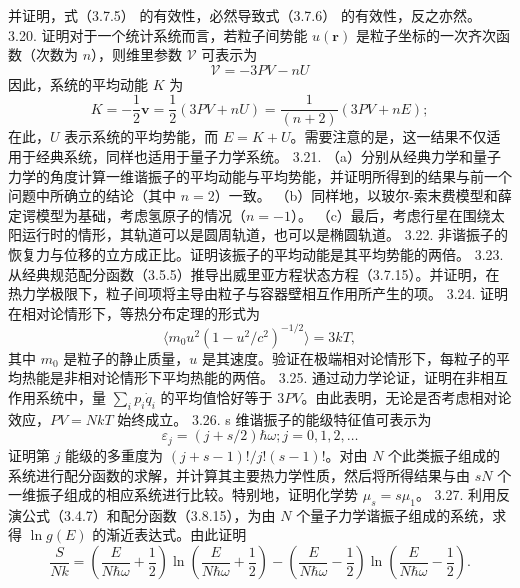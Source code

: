并证明，式（3.7.5） 的有效性，必然导致式（3.7.6） 的有效性，反之亦然。
3.20. 证明对于一个统计系统而言，若粒子间势能 \(u(\boldsymbol{r})\) 是粒子坐标的一次齐次函数（次数为 \(n\)），则维里参数 \(\mathcal{V}\) 可表示为
\begin{equation}\tag{3.5.133}\label{eq:3.5.133}
\mathcal { V } = - 3 P V - n U
\end{equation}
因此，系统的平均动能 \(K\) 为
\begin{equation}\tag{3.5.134}\label{eq:3.5.134}
K = - { \frac { 1 } { 2 } } { \mathbf { v } } = { \frac { 1 } { 2 } } ( 3 P V + n U ) = { \frac { 1 } { ( n + 2 ) } } ( 3 P V + n E ) ;
\end{equation}
在此，\(U\) 表示系统的平均势能，而 \(E = K + U\)。需要注意的是，这一结果不仅适用于经典系统，同样也适用于量子力学系统。
3.21. （a）分别从经典力学和量子力学的角度计算一维谐振子的平均动能与平均势能，并证明所得到的结果与前一个问题中所确立的结论（其中 \(n=2\)）一致。
（b）同样地，以玻尔-索末费模型和薛定谔模型为基础，考虑氢原子的情况（\(n=-1\)）。
（c）最后，考虑行星在围绕太阳运行时的情形，其轨道可以是圆周轨道，也可以是椭圆轨道。
3.22. 非谐振子的恢复力与位移的立方成正比。证明该振子的平均动能是其平均势能的两倍。
3.23. 从经典规范配分函数（3.5.5）推导出威里亚方程状态方程（3.7.15）。并证明，在热力学极限下，粒子间项将主导由粒子与容器壁相互作用所产生的项。
3.24. 证明在相对论情形下，等热分布定理的形式为
\begin{equation}\tag{3.5.135}\label{eq:3.5.135}
\langle m _ { 0 } u ^{2} ( 1 - u ^{2} / c ^{2} ) ^{- 1 / 2} \rangle = 3 k T ,
\end{equation}
其中 \(m_{0}\) 是粒子的静止质量，\(u\) 是其速度。验证在极端相对论情形下，每粒子的平均热能是非相对论情形下平均热能的两倍。
3.25. 通过动力学论证，证明在非相互作用系统中，量 \(\sum_{i}p_{i}\dot{q}_{i}\) 的平均值恰好等于 \(3PV\)。由此表明，无论是否考虑相对论效应，\(PV=NkT\) 始终成立。
3.26. s 维谐振子的能级特征值可表示为
\begin{equation}\tag{3.5.136}\label{eq:3.5.136}
\varepsilon _ { j } = ( j + s / 2 ) \hbar \omega ;  j = 0 , 1 , 2 , \ldots
\end{equation}
证明第 \(j\) 能级的多重度为 \((j+s-1)!/j!(s-1)!\)。对由 \(N\) 个此类振子组成的系统进行配分函数的求解，并计算其主要热力学性质，然后将所得结果与由 \(sN\) 个一维振子组成的相应系统进行比较。特别地，证明化学势 \(\mu_{s}=s\mu_{1}\)。
3.27. 利用反演公式（3.4.7）和配分函数（3.8.15），为由 \(N\) 个量子力学谐振子组成的系统，求得 \(\ln g(E)\) 的渐近表达式。由此证明
\begin{equation}\tag{3.5.137}\label{eq:3.5.137}
\frac { S } { N k } = \left( \frac { E } { N \hbar \omega } + \frac { 1 } { 2 } \right) \ln \left( \frac { E } { N \hbar \omega } + \frac { 1 } { 2 } \right) - \left( \frac { E } { N \hbar \omega } - \frac { 1 } { 2 } \right) \ln \left( \frac { E } { N \hbar \omega } - \frac { 1 } { 2 } \right) .
\end{equation}
